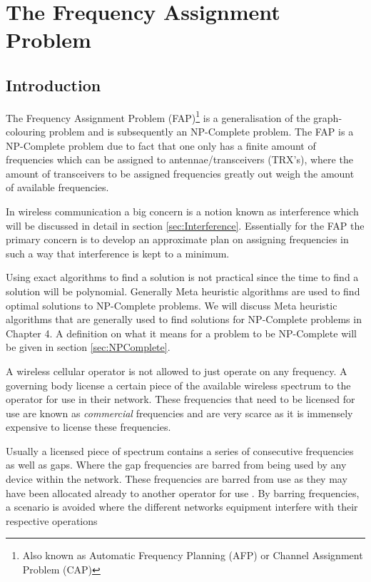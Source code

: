 \chapter{The Frequency Assignment Problem}
\label{chpt:fap}
\section{Introduction}
The Frequency Assignment Problem (FAP)\footnote{Also known as Automatic Frequency Planning (AFP) or Channel Assignment Problem (CAP)\cite{ACOvsEA}} is a generalisation of the graph-colouring problem and is subsequently an NP-Complete problem\cite{FAPRAMColouring}. The FAP is a NP-Complete problem due to fact that one only has a finite amount of frequencies which can be assigned to antennae/transceivers (TRX's), where the amount of transceivers to be assigned frequencies greatly out weigh the amount of available frequencies\cite{FAPRAMColouring}.

In wireless communication a big concern is a notion known as interference which will be discussed in detail in section \ref{sec:Interference}. Essentially for the FAP the primary concern is to develop an approximate plan on assigning frequencies in such a way that interference is kept to a minimum. 

Using exact algorithms to find a solution is not practical since the time to find a solution will be polynomial. Generally Meta heuristic algorithms are used to find optimal solutions to NP-Complete problems\cite{ACOvsEA}. We will discuss Meta heuristic algorithms that are generally used to find solutions for NP-Complete problems in Chapter 4. A definition on what it means for a problem to be NP-Complete will be given in section \ref{sec:NPComplete}. 

A wireless cellular operator is not allowed to just operate on any frequency. A governing body license a certain piece of the available wireless spectrum to the operator for use in their network\cite{FAPRAMColouring}. These frequencies that need to be licensed for use are known as \emph{commercial} frequencies and are very scarce as it is immensely expensive to license these frequencies\cite{FAPRAMColouring}. 

Usually a licensed piece of spectrum contains a series of consecutive frequencies as well as gaps. Where the gap frequencies are barred from being used by any device within the network. These frequencies are barred from use as they may have been allocated already to another operator for use \cite{FAPInCell}. By barring frequencies, a scenario is avoided where the different networks equipment interfere with their respective operations \cite{FAPInCell}

